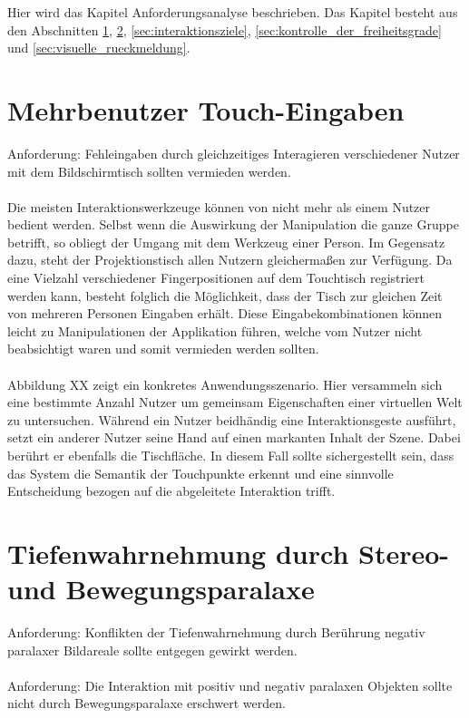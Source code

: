 Hier wird das Kapitel Anforderungsanalyse beschrieben. Das Kapitel besteht aus den Abschnitten \ref{sec:mehrbenutzer_touch_eingaben}, \ref{sec:tiefenwahrnehmung}, \ref{sec:interaktionsziele}, \ref{sec:kontrolle_der_freiheitsgrade} und \ref{sec:visuelle_rueckmeldung}.


\section{Mehrbenutzer Touch-Eingaben}
\label{sec:mehrbenutzer_touch_eingaben}

Anforderung: Fehleingaben durch gleichzeitiges Interagieren verschiedener Nutzer mit dem Bildschirmtisch sollten vermieden werden.
\\\\
Die meisten Interaktionswerkzeuge können von nicht mehr als einem Nutzer bedient werden. Selbst wenn die Auswirkung der Manipulation die ganze Gruppe betrifft, so obliegt der Umgang mit dem Werkzeug einer Person. Im Gegensatz dazu, steht der Projektionstisch allen Nutzern gleichermaßen zur Verfügung. Da eine Vielzahl verschiedener Fingerpositionen auf dem Touchtisch registriert werden kann, besteht folglich die Möglichkeit, dass der Tisch zur gleichen Zeit von mehreren Personen Eingaben erhält. Diese Eingabekombinationen können leicht zu Manipulationen der Applikation führen, welche vom Nutzer nicht beabsichtigt waren und somit vermieden werden sollten.
\\\\
Abbildung XX zeigt ein konkretes Anwendungsszenario. Hier versammeln sich eine bestimmte Anzahl Nutzer um gemeinsam Eigenschaften einer virtuellen Welt zu untersuchen. Während ein Nutzer beidhändig eine Interaktionsgeste ausführt, setzt ein anderer Nutzer seine Hand auf einen markanten Inhalt der Szene. Dabei berührt er ebenfalls die Tischfläche. In diesem Fall sollte sichergestellt sein, dass das System die Semantik der Touchpunkte erkennt und eine sinnvolle Entscheidung bezogen auf die abgeleitete Interaktion trifft. 


\section{Tiefenwahrnehmung durch Stereo- und Bewegungsparalaxe}
\label{sec:tiefenwahrnehmung}

Anforderung: Konflikten der Tiefenwahrnehmung durch Berührung negativ paralaxer Bildareale sollte entgegen gewirkt werden.
\\\\
Anforderung: Die Interaktion mit positiv und negativ paralaxen Objekten sollte nicht durch Bewegungsparalaxe erschwert werden. 


